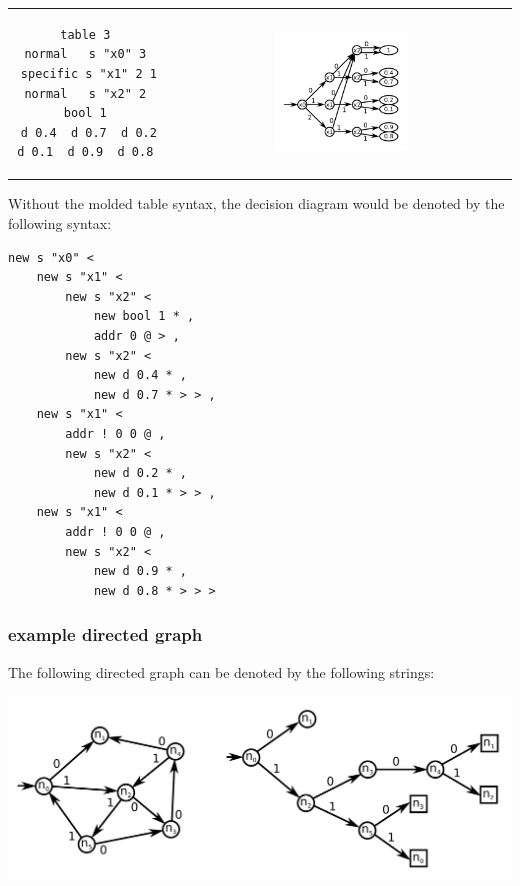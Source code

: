 \documentclass{article}
\begin{document}
\begin{tabular}{cc}
\begin{minipage}[b]{0.4\textwidth}
\begin{verbatim}
table 3 
normal   s "x0" 3 
specific s "x1" 2 1
normal   s "x2" 2 
bool 1 
d 0.4  d 0.7  d 0.2  d 0.1  d 0.9  d 0.8 
\end{verbatim}
\end{minipage} & 
\includegraphics[width = 0.4\textwidth]{example_molded_array_2.pdf} \\
\end{tabular}

\vspace{5mm}

Without the molded table syntax, the decision diagram would be denoted by the following syntax:

\begin{verbatim}
new s "x0" < 
    new s "x1" < 
        new s "x2" < 
            new bool 1 * , 
            addr 0 @ > , 
        new s "x2" < 
            new d 0.4 * , 
            new d 0.7 * > > , 
    new s "x1" < 
        addr ! 0 0 @ , 
        new s "x2" < 
            new d 0.2 * , 
            new d 0.1 * > > , 
    new s "x1" < 
        addr ! 0 0 @ , 
        new s "x2" < 
            new d 0.9 * , 
            new d 0.8 * > > >  
\end{verbatim}

\vspace{5mm}


\subsubsection{example directed graph}

The following directed graph can be denoted by the following strings:

\includegraphics[width = \textwidth]{subgraph_with_tracer_tree}
\end{document}
